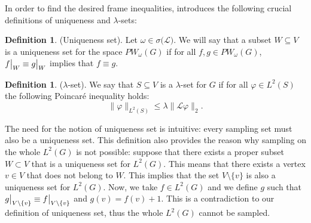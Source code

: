 \documentclass[12pt]{amsart}
\theoremstyle{definition}
\newtheorem{definition}[theorem]{Definition}
\numberwithin{equation}{section}
\newcommand\restr[2]{{%
  \left.\kern-\nulldelimiterspace %
  #1 %
  \vphantom{\big|} %
  \right|_{#2} %
  }}
\theoremstyle{definition}
\theoremstyle{remark}
\numberwithin{equation}{section}
\begin{document}
In order to find the desired frame inequalities, \cite{PW1} introduces the following crucial definitions of uniqueness and $\lambda$-sets:
\begin{definition}
\label{def uset}
(Uniqueness set). Let $\omega \in \sigma(\mathcal{L)}$. We will say that a subset $W\subseteq V$ is a uniqueness set for the space $PW_\omega(G)$ if for all $f,g \in PW_\omega(G)$, $\restr{f}{W}\equiv\restr{g}{W}$ implies that $ f\equiv g$.
\end{definition}
\begin{definition}
\label{def lset}
($\lambda$-set). We say that $S \subseteq V$ is a $\lambda$-set for $G$ if for all $\varphi \in L^2(S)$ the following Poincaré inequality holds: 
    \begin{equation}
    \label{lambdaset}
           \|\varphi\|_{L^2(S)}\leq \lambda \|\mathcal{L}\varphi\|_{2}.  
    \end{equation}
\end{definition}
The need for the notion of uniqueness set is intuitive: every sampling set must also be a uniqueness set. This definition also provides the reason why sampling on the whole $L^2(G)$ is not possible: suppose that there exists a proper subset $W \subset V$ that is a uniqueness set for $L^2(G)$. This means that there exists a vertex $v \in V$ that does not belong to $W$. This implies that the set $V\setminus\{v\}$ is also a uniqueness set for $L^2(G)$. Now, we take $f \in L^2(G)$ and we define $g$ such that $\restr{g}{V\setminus\{v\}}\equiv \restr{f}{V\setminus\{v\}}$ and $g(v) = f(v) +1$. This is a contradiction to our definition of uniqueness set, thus the whole $L^2(G)$ cannot be sampled.
\end{document}
